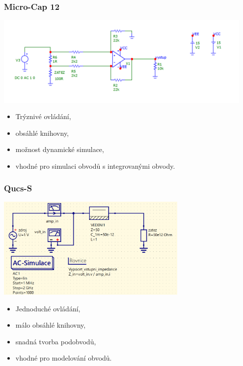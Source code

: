 \documentclass{beamer}
\begin{document}
  \begin{frame}
    \frametitle{Micro-Cap 12}
    
		\begin{center}
			\includegraphics[width=0.95\textwidth]{obr/microcap12.png} 
		\end{center}
		
		
		\begin{itemize}
			\item Trýznivé ovládání,
			\item obsáhlé knihovny,
			\item možnost dynamické simulace,
			\item vhodné pro simulaci obvodů s integrovanými obvody.
		\end{itemize}
    
  \end{frame}
  \begin{frame}
    \frametitle{Qucs-S}
    
		\begin{center}
			\includegraphics[width=0.7\textwidth]{obr/qucs-s.png} 
		\end{center}
		
		
		\begin{itemize}
			\item Jednoduché ovládání,
			\item málo obsáhlé knihovny,
			\item snadná tvorba podobvodů,
			\item vhodné pro modelování obvodů.
		\end{itemize}
    
  \end{frame}
	
\end{document}
